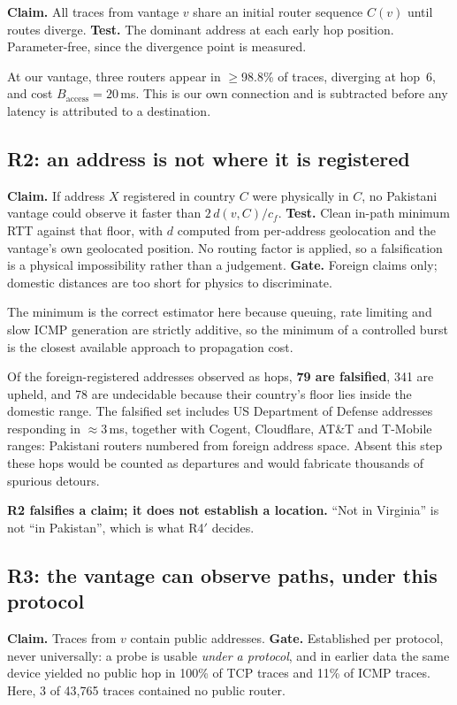 \textbf{Claim.} All traces from vantage $v$ share an initial router sequence $C(v)$ until
routes diverge. \textbf{Test.} The dominant address at each early hop position.
Parameter-free, since the divergence point is measured.

At our vantage, three routers appear in $\geq$98.8\% of traces, diverging at hop~6, and
cost $B_{\mathrm{access}} = 20$\,ms. This is our own connection and is subtracted before
any latency is attributed to a destination.

\subsection{R2: an address is not where it is registered}

\textbf{Claim.} If address $X$ registered in country $C$ were physically in $C$, no
Pakistani vantage could observe it faster than $2\,d(v,C)/c_f$. \textbf{Test.} Clean
in-path minimum RTT against that floor, with $d$ computed from per-address geolocation and
the vantage's own geolocated position. No routing factor is applied, so a falsification is
a physical impossibility rather than a judgement. \textbf{Gate.} Foreign claims only;
domestic distances are too short for physics to discriminate.

The minimum is the correct estimator here because queuing, rate limiting and slow ICMP
generation are strictly additive, so the minimum of a controlled burst is the closest
available approach to propagation cost.

Of the foreign-registered addresses observed as hops, \textbf{79 are falsified}, 341 are
upheld, and 78 are undecidable because their country's floor lies inside the domestic
range. The falsified set includes US Department of Defense addresses responding in
$\approx$3\,ms, together with Cogent, Cloudflare, AT\&T and T-Mobile ranges: Pakistani
routers numbered from foreign address space. Absent this step these hops would be counted
as departures and would fabricate thousands of spurious detours.

\textbf{R2 falsifies a claim; it does not establish a location.} ``Not in Virginia'' is
not ``in Pakistan'', which is what R4$'$ decides.

\subsection{R3: the vantage can observe paths, under this protocol}

\textbf{Claim.} Traces from $v$ contain public addresses. \textbf{Gate.} Established per
protocol, never universally: a probe is usable \emph{under a protocol}, and in earlier
data the same device yielded no public hop in 100\% of TCP traces and 11\% of ICMP traces.
Here, 3 of 43{,}765 traces contained no public router.

